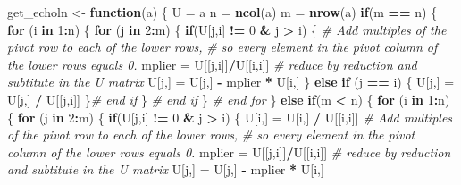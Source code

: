 \documentclass[]{article}
\newenvironment{Shaded}{\begin{snugshade}}{\end{snugshade}}
\newcommand{\CommentTok}[1]{\textcolor[rgb]{0.56,0.35,0.01}{\textit{#1}}}
\newcommand{\ControlFlowTok}[1]{\textcolor[rgb]{0.13,0.29,0.53}{\textbf{#1}}}
\newcommand{\DecValTok}[1]{\textcolor[rgb]{0.00,0.00,0.81}{#1}}
\newcommand{\KeywordTok}[1]{\textcolor[rgb]{0.13,0.29,0.53}{\textbf{#1}}}
\newcommand{\NormalTok}[1]{#1}
\newcommand{\OperatorTok}[1]{\textcolor[rgb]{0.81,0.36,0.00}{\textbf{#1}}}
\newcommand{\StringTok}[1]{\textcolor[rgb]{0.31,0.60,0.02}{#1}}
\begin{document}
\begin{Shaded}
\begin{Highlighting}[]
\NormalTok{get_echoln <-}\StringTok{ }\ControlFlowTok{function}\NormalTok{(a) \{}
\NormalTok{  U =}\StringTok{ }\NormalTok{a}
\NormalTok{  n =}\StringTok{ }\KeywordTok{ncol}\NormalTok{(a)}
\NormalTok{  m =}\StringTok{ }\KeywordTok{nrow}\NormalTok{(a)}
  \ControlFlowTok{if}\NormalTok{(m }\OperatorTok{==}\StringTok{ }\NormalTok{n) \{}
    \ControlFlowTok{for}\NormalTok{ (i }\ControlFlowTok{in} \DecValTok{1}\OperatorTok{:}\NormalTok{n) \{}
      \ControlFlowTok{for}\NormalTok{ (j }\ControlFlowTok{in} \DecValTok{2}\OperatorTok{:}\NormalTok{m) \{}
        \ControlFlowTok{if}\NormalTok{(U[j,i] }\OperatorTok{!=}\StringTok{ }\DecValTok{0} \OperatorTok{&}\StringTok{ }\NormalTok{j }\OperatorTok{>}\StringTok{ }\NormalTok{i) \{}
          \CommentTok{# Add multiples of the pivot row to each of the lower rows, }
          \CommentTok{# so every element in the pivot column of the lower rows equals 0.}
\NormalTok{          mplier =}\StringTok{ }\NormalTok{U[[j,i]]}\OperatorTok{/}\NormalTok{U[[i,i]]}
          \CommentTok{# reduce by reduction and subtitute in the U matrix}
\NormalTok{          U[j,] =}\StringTok{ }\NormalTok{U[j,] }\OperatorTok{-}\StringTok{ }\NormalTok{mplier }\OperatorTok{*}\StringTok{ }\NormalTok{U[i,]}
\NormalTok{        \} }\ControlFlowTok{else} \ControlFlowTok{if}\NormalTok{ (j }\OperatorTok{==}\StringTok{ }\NormalTok{i) \{}
\NormalTok{          U[j,] =}\StringTok{ }\NormalTok{U[j,] }\OperatorTok{/}\StringTok{ }\NormalTok{U[[j,i]]}
\NormalTok{        \}}\CommentTok{# end if}
\NormalTok{      \} }\CommentTok{# end if }
\NormalTok{    \} }\CommentTok{# end for}
\NormalTok{  \} }\ControlFlowTok{else} \ControlFlowTok{if}\NormalTok{(m }\OperatorTok{<}\StringTok{ }\NormalTok{n) \{}
    \ControlFlowTok{for}\NormalTok{ (i }\ControlFlowTok{in} \DecValTok{1}\OperatorTok{:}\NormalTok{n) \{}
      \ControlFlowTok{for}\NormalTok{ (j }\ControlFlowTok{in} \DecValTok{2}\OperatorTok{:}\NormalTok{m) \{}
        \ControlFlowTok{if}\NormalTok{(U[j,i] }\OperatorTok{!=}\StringTok{ }\DecValTok{0} \OperatorTok{&}\StringTok{ }\NormalTok{j }\OperatorTok{>}\StringTok{ }\NormalTok{i) \{}
\NormalTok{          U[i,] =}\StringTok{ }\NormalTok{U[i,] }\OperatorTok{/}\StringTok{ }\NormalTok{U[[i,i]]}
          \CommentTok{# Add multiples of the pivot row to each of the lower rows, }
          \CommentTok{# so every element in the pivot column of the lower rows equals 0.}
\NormalTok{          mplier =}\StringTok{ }\NormalTok{U[[j,i]]}\OperatorTok{/}\NormalTok{U[[i,i]]}
          \CommentTok{# reduce by reduction and subtitute in the U matrix}
\NormalTok{          U[j,] =}\StringTok{ }\NormalTok{U[j,] }\OperatorTok{-}\StringTok{ }\NormalTok{mplier }\OperatorTok{*}\StringTok{ }\NormalTok{U[i,]}
          

\end{Highlighting}
\end{Shaded}
\end{document}

